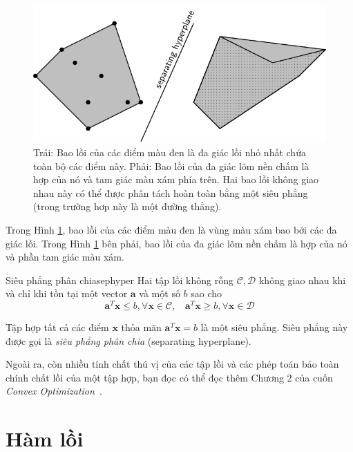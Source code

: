 \begin{figure}[t]
\centering
    \includegraphics[width = .7\textwidth]{Chapters/08_ConvexOptimization/16_convexity/latex/convex_hull.pdf}
    \caption[]{Trái: Bao lồi của các điểm màu đen là đa giác lồi nhỏ nhất chứa toàn bộ các điểm này. Phải: Bao lồi của đa giác lõm nền chấm là hợp của nó và tam giác màu xám phía trên. Hai bao lồi không giao nhau này có thể được phân tách hoàn toàn bằng một siêu phẳng (trong trường hơp này là một đường thẳng).}
    \label{fig:16_convex_hull}
    \captionsetup[figure]{format=rule, justification=centering}
\end{figure}


Trong Hình \ref{fig:16_convex_hull}, bao lồi của các điểm màu đen là vùng
màu xám bao bởi các đa giác lồi. Trong Hình \ref{fig:16_convex_hull} bên phải,
bao lồi của đa giác lõm nền chấm là hợp của nó và phần tam giác màu xám. 

\begin{mytheo}{Siêu phẳng phân chia}{sephyper}
Hai {tập lồi không rỗng} $\mathcal{C}, \mathcal{D}$  {không giao
nhau} khi và chỉ khi tồn tại một vector $\mathbf{a}$ và một số $b$ sao cho
\begin{equation*} 
\mathbf{a}^T\mathbf{x} \leq b, \forall \mathbf{x} \in \mathcal{C}, ~~ \text{}~~ \mathbf{a}^T\mathbf{x} \geq b, \forall \mathbf{x} \in \mathcal{D} 
\end{equation*} 

Tập hợp tất cả các điểm $\mathbf{x}$ thỏa mãn $\mathbf{a}^T\mathbf{x} = b$ là một siêu phẳng. Siêu phẳng này được gọi là \textit{siêu phẳng phân chia} ({separating hyperplane}). 
\end{mytheo}

Ngoài ra, còn nhiều tính chất thú vị của các tập lồi và các phép toán bảo toàn
chính chất {lồi} của một tập hợp, bạn đọc có thể đọc thêm
Chương 2 của cuốn \textit{Convex Optimization}~\cite{boyd2004convex}.
 
 
\section{Hàm lồi}
 
